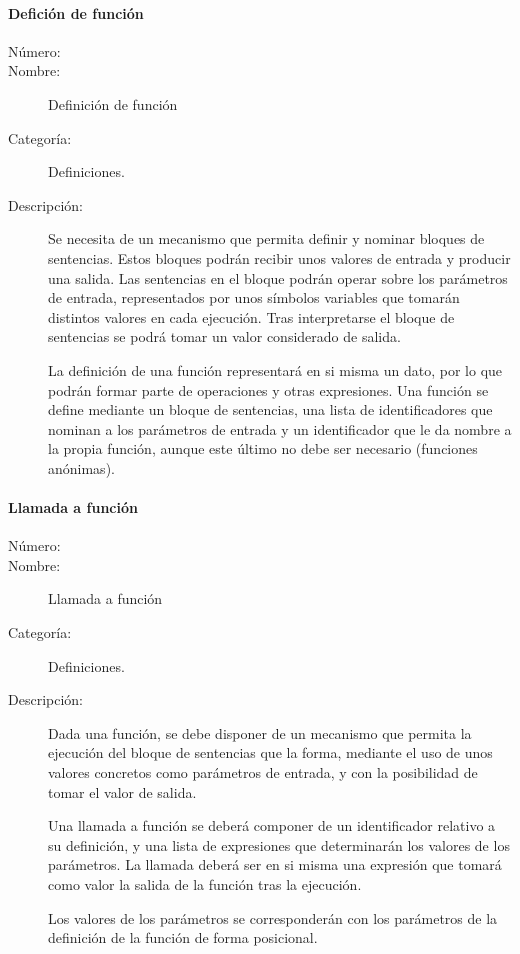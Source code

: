 \paragraph{Defición de función}
\begin{framed}
	\begin{description}
		\item [Número:] \cn
		\item [Nombre:] Definición de función
		\item [Categoría:] Definiciones.
		\item [Descripción:] Se necesita de un mecanismo que permita definir y nominar bloques de sentencias. Estos bloques podrán recibir unos valores
		de entrada y producir una salida. Las sentencias en el bloque podrán operar sobre los parámetros de entrada, representados por
		unos símbolos variables que tomarán distintos valores en cada ejecución. Tras interpretarse el bloque 
		de sentencias se podrá tomar un valor considerado de salida. 
		
		La definición de una función representará en si misma un dato, por lo que podrán formar parte de operaciones 
		y otras expresiones. 
		Una función se define mediante un bloque de sentencias, una lista de identificadores que nominan a los parámetros de entrada y un 
		identificador que le da nombre a la propia función, aunque este último no debe ser necesario (funciones anónimas). 
		
	\end{description}
\end{framed}

\paragraph{Llamada a función}
\begin{framed}
	\begin{description}
		\item [Número:] \cn
		\item [Nombre:] Llamada a función
		\item [Categoría:] Definiciones.
		\item [Descripción:] Dada una función, se debe disponer de un mecanismo que permita la ejecución del bloque de 
		sentencias que la forma, mediante el uso de unos valores concretos como parámetros de entrada, y con la posibilidad de tomar 
		el valor de salida.
		
		Una llamada a función se deberá componer de un identificador relativo a su definición, y una lista de expresiones
		que determinarán los valores de los parámetros. La llamada deberá ser en si misma una expresión 
		que tomará como valor la salida de la función tras la ejecución.
		
		Los valores de los parámetros se corresponderán con los parámetros de la definición de la función de forma posicional.
	\end{description}
\end{framed}

